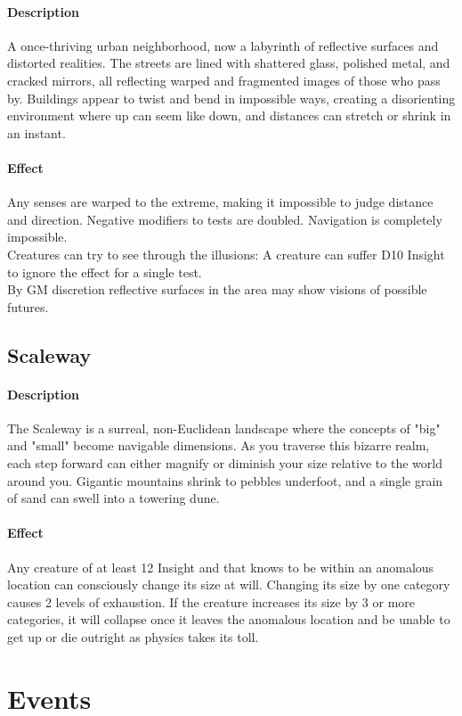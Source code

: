 \paragraph{Description}
A once-thriving urban neighborhood,
	now a labyrinth of reflective surfaces and distorted realities.
The streets are lined with shattered glass, polished metal, and cracked mirrors,
	all reflecting warped and fragmented images of those who pass by.
Buildings appear to twist and bend in impossible ways,
	creating a disorienting environment where up can seem like down,
	and distances can stretch or shrink in an instant.
\paragraph{Effect}
Any senses are warped to the extreme,
	making it impossible to judge distance and direction.
Negative modifiers to tests are doubled.
Navigation is completely impossible.
\\%
Creatures can try to see through the illusions:
A creature can suffer D10 Insight to ignore the effect for a single test.
\\%
By GM discretion reflective surfaces in the area may show visions of possible futures.
\subsection*{Scaleway}
\paragraph{Description}
The Scaleway is a surreal, non-Euclidean landscape
	where the concepts of "big" and "small" become navigable dimensions.
As you traverse this bizarre realm,
	each step forward can either magnify or diminish your size
	relative to the world around you.
Gigantic mountains shrink to pebbles underfoot,
	and a single grain of sand can swell into a towering dune. 
\paragraph{Effect}
Any creature of at least 12 Insight
	and that knows to be within an anomalous location
	can consciously change its size at will.
Changing its size by one category causes 2 levels of exhaustion.
If the creature increases its size by 3 or more categories,
	it will collapse once it leaves the anomalous location
	and be unable to get up or die outright
	as physics takes its toll.

\section{Events}
